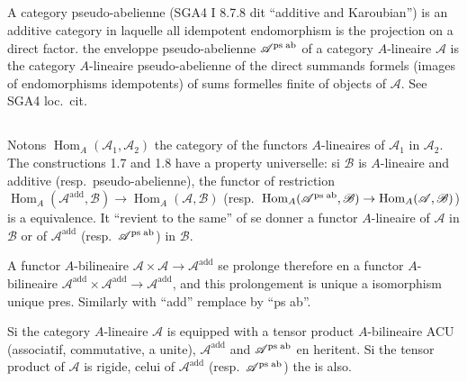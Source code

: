 \documentclass[11pt,a4paper]{article}
\theoremstyle{plain}
\theoremstyle{definition}
\DeclareMathOperator{\Hom}{Hom}
\begin{document}
\subsection{}
A category pseudo-abelienne (SGA4 I 8.7.8 dit ``additive and Karoubian'') is an additive category in laquelle all idempotent endomorphism is the projection on a direct factor. the enveloppe pseudo-abelienne $\mathcal{A}^{\text{ps\;ab}}$ of a category $A$-lineaire $\mathcal{A}$ is the category $A$-lineaire pseudo-abelienne of the direct summands formels (images of endomorphisms idempotents) of sums formelles finite of objects of $\mathcal{A}$. See SGA4 loc.~cit.

\subsection{}
Notons $\Hom_A(\mathcal{A}_1, \mathcal{A}_2)$ the category of the functors $A$-lineaires of $\mathcal{A}_1$ in $\mathcal{A}_2$. The constructions 1.7 and 1.8 have a property universelle: si $\mathcal{B}$ is $A$-lineaire and additive (resp.~pseudo-abelienne), the functor of restriction $\Hom_A(\mathcal{A}^{\text{add}}, \mathcal{B}) \to \Hom_A(\mathcal{A}, \mathcal{B})$ (resp.~$\Hom_A(\mathcal{A}^{\text{ps\;ab}}, \mathcal{B}) \to \Hom_A(\mathcal{A}, \mathcal{B})$) is a equivalence. It ``revient to the same'' of se donner a functor $A$-lineaire of $\mathcal{A}$ in $\mathcal{B}$ or of $\mathcal{A}^{\text{add}}$ (resp.~$\mathcal{A}^{\text{ps\;ab}}$) in $\mathcal{B}$.

A functor $A$-bilineaire $\mathcal{A} \times \mathcal{A} \to \mathcal{A}^{\text{add}}$ se prolonge therefore en a functor $A$-bilineaire $\mathcal{A}^{\text{add}} \times \mathcal{A}^{\text{add}} \to \mathcal{A}^{\text{add}}$, and this prolongement is unique a isomorphism unique pres. Similarly with ``add'' remplace by ``ps ab''.

Si the category $A$-lineaire $\mathcal{A}$ is equipped with a tensor product $A$-bilineaire ACU (associatif, commutative, a unite), $\mathcal{A}^{\text{add}}$ and $\mathcal{A}^{\text{ps\;ab}}$ en heritent. Si the tensor product of $\mathcal{A}$ is rigide, celui of $\mathcal{A}^{\text{add}}$ (resp.~$\mathcal{A}^{\text{ps\;ab}}$) the is also.
\end{document}
